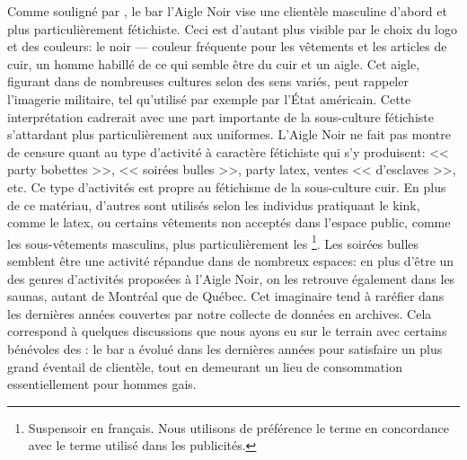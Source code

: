 Comme souligné par \citet{Giraud2013}, le bar l'Aigle Noir vise une clientèle masculine d'abord et plus particulièrement fétichiste.
Ceci est d'autant plus visible par le choix du logo et des couleurs: le noir --- couleur fréquente pour les vêtements et les articles de cuir, un homme habillé de ce qui semble être du cuir et un aigle.
Cet aigle, figurant dans de nombreuses cultures selon des sens variés, peut rappeler l'imagerie militaire, tel qu'utilisé par exemple par l'État américain.
Cette interprétation cadrerait avec une part importante de la sous-culture fétichiste s'attardant plus particulièrement aux uniformes.
L'Aigle Noir ne fait pas montre de censure quant au type d'activité à caractère fétichiste qui s'y produisent: << party bobettes >>, << soirées bulles >>, party latex, ventes << d'esclaves >>, etc.
Ce type d'activités est propre au fétichisme de la sous-culture cuir.
En plus de ce matériau, d'autres sont utilisés selon les individus pratiquant le kink, comme le latex, ou certains vêtements non acceptés dans l'espace public, comme les sous-vêtements masculins, plus particulièrement les \footnote{Suspensoir en français. Nous utilisons de préférence le terme  en concordance avec le terme utilisé dans les publicités.}.
Les soirées bulles semblent être une activité répandue dans de nombreux espaces: en plus d'être un des genres d'activités proposées à l'Aigle Noir, on les retrouve également dans les saunas, autant de Montréal que de Québec.
Cet imaginaire tend à raréfier dans les dernières années couvertes par notre collecte de données en archives.
Cela correspond à quelques discussions que nous ayons eu sur le terrain avec certains bénévoles des \agq{}: le bar a évolué dans les dernières années pour satisfaire un plus grand éventail de clientèle, tout en demeurant un lieu de consommation essentiellement pour hommes gais.

